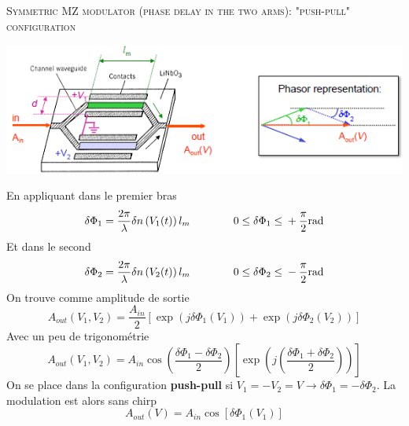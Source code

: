 \textsc{Symmetric MZ modulator (phase delay in the two arms): "push-pull" configuration }\\
\begin{center}
	\includegraphics[scale=0.7]{ch4/image30}
\end{center}
En appliquant dans le premier bras
\begin{equation}
\delta {\Phi _1} { } =  { }\frac{{2\pi }}{\lambda }\delta n\left( {{V_1}(t)} \right) { }{l_m}\qquad\qquad 0 {  } \le \delta {\Phi _1} {  } \le  { } + \frac{\pi }{2} {   }{\rm{rad}}
\end{equation}
Et dans le second
\begin{equation}
\delta {\Phi _2} { } =  { }\frac{{2\pi }}{\lambda }\delta n\left( {{V_2}(t)} \right) { }{l_m}\qquad\qquad
0 {  } \le \delta {\Phi _2} {  } \le  { } - \frac{\pi }{2} {   }{\rm{rad}}
\end{equation}
On trouve comme amplitude de sortie
\begin{equation}
{A_{out}}({V_1},{V_2}) { } =  { }\frac{{{A_{in}}}}{2} {  }\left[ {\exp \left( {j { }\delta {\Phi _1}\left( {{V_1}} \right)} \right) { } +  { }\exp \left( {j { }\delta {\Phi _2}\left( {{V_2}} \right)} \right)} \right] { }
\end{equation}
Avec un peu de trigonométrie
\begin{equation}
{A_{out}}({V_1},{V_2}) { } =  { }{A_{in}}\cos \left( {\frac{{\delta {\Phi _1} - \delta {\Phi _2}}}{2}} \right) { }\left[ {\exp \left( {j { }\left( {\frac{{\delta {\Phi _1} + \delta {\Phi _2}}}{2}} \right)} \right)} \right] { }
\end{equation}
On se place dans la configuration \textbf{push-pull} si $V_1=-V_2=V \to \delta\Phi_1=-\delta\Phi_2$. 
La modulation est alors sans chirp
\begin{equation}
{A_{out}}(V) { } =  { }{A_{in}}\cos \left[ {\delta {\Phi _1}\left( {{V_1}} \right)} \right] { }
\end{equation}

